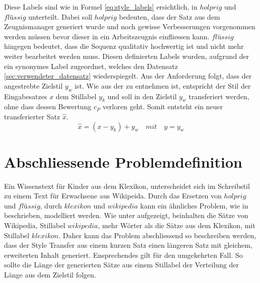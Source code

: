 \noindent
Diese Labels sind wie in Formel \ref{eq:style_labels} ersichtlich, in $holprig$ und $flüssig$ unterteilt. Dabei soll
$holprig$ bedeuten, dass der Satz aus dem Zeugnismanager generiert wurde und noch gewisse Verbesserungen vorgenommen
werden müssen bevor dieser in ein Arbeitszeugnis einfliessen kann. $flüssig$ hingegen bedeutet, dass die Sequenz
qualitativ hochwertig ist und nicht mehr weiter bearbeitet werden muss. Diesen definierten Labels wurden, aufgrund der
 ein synonymes Label zugeordnet, welches den Datensatz
\ref{sec:verwendeter_datensatz} wiederspiegelt. Aus der Anforderung folgt, dass der angestrebte Zielstil $y_w$ ist.
\newline
\newline
Wie aus der  zu entnehmen ist, entspricht der Stil der Eingabesatzes $x$ dem Stillabel
$y_k$ und soll in den Zielstil $y_w$ transferiert werden, ohne dass dessen Bewertung $c_P$ verloren geht. Somit entsteht
ein neuer transferierter Satz $\hat{x}$.
\begin{equation}
	\hat{x} = (x - y_k)  + y_w \quad mit \quad y = y_w
	\label{eq:problemdefinition}
\end{equation}

\section{Abschliessende Problemdefinition}
\label{sec:abschliessende_problemdefinition}
Ein Wissenstext für Kinder aus dem Klexikon, unterscheidet sich im Schreibstil zu einem Text für Erwachsene aus
Wikipeida. Durch das Ersetzen von $ holprig $ und $ flüssig $, durch $ klexikon $ und $ wikipedia $ kann ein ähnliches
Problem, wie in  beschrieben, modelliert werden. Wie unter
 aufgezeigt, beinhalten die Sätze von Wikipedia, Stillabel $ wikipedia
$, mehr Wörter als die Sätze aus dem Klexikon, mit Stillabel $ klexikon $. Daher kann das Problem abschliessend so
beschreiben werden, dass der Style Transfer aus einem kurzen Satz einen längeren Satz mit gleichem, erweiterten Inhalt
generiert. Ensprechendes gilt für den umgekehrten Fall. So sollte die Länge der generierten Sätze aus einem Stillabel
der Verteilung der Länge aus dem Zielstil folgen.

